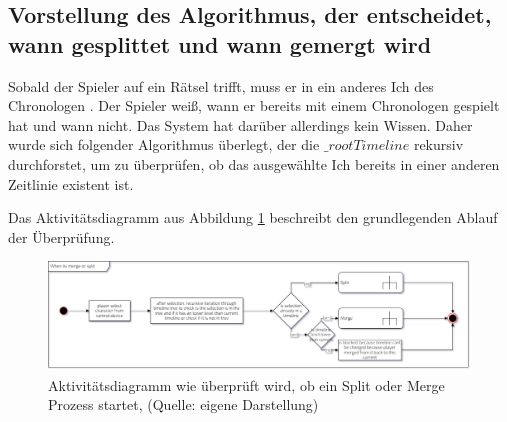 \subsection{Vorstellung des Algorithmus, der entscheidet, wann gesplittet und wann gemergt wird}\label{sec:core_algo_split_merge}
Sobald der Spieler auf ein Rätsel trifft, muss er in ein anderes Ich des Chronologen . Der Spieler weiß, wann er bereits mit einem Chronologen gespielt hat und wann nicht. Das System hat darüber allerdings kein Wissen. Daher wurde sich folgender Algorithmus überlegt, der die $\_rootTimeline$ rekursiv durchforstet, um zu überprüfen, ob das ausgewählte Ich bereits in einer anderen Zeitlinie existent ist.

Das Aktivitätsdiagramm aus Abbildung \ref{fig:check-if-split-merge} beschreibt den grundlegenden Ablauf der Überprüfung.
\begin{figure}[ht]
\centering
\includegraphics[width=1\linewidth]{content/pictures/CheckIfSplit.jpg}
\caption{Aktivitätsdiagramm wie überprüft wird, ob ein Split oder Merge Prozess startet, (Quelle: eigene Darstellung)}
\label{fig:check-if-split-merge}
\end{figure}

